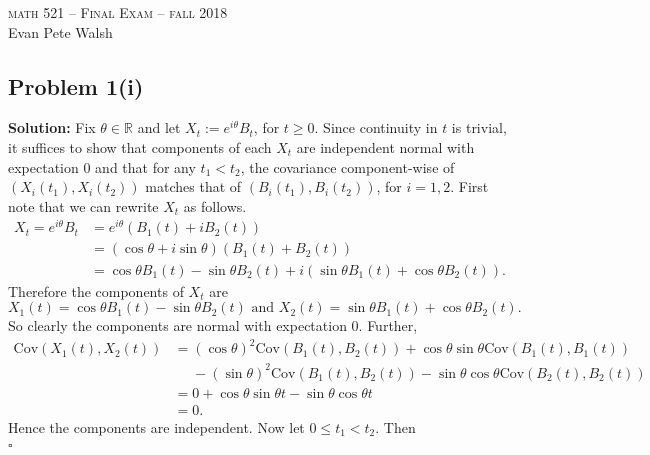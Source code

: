 \documentclass[12pt]{article}
\newcounter{ProofCounter}
\newenvironment{Solution}{\stepcounter{ProofCounter}\textbf{Solution:}}{\hfill$\square$}
\begin{document}
\thispagestyle{empty}
\begin{center}
  \Large \textsc{math 521 -- Final Exam -- fall 2018} \\ 
  \vspace{5mm}
  \large Evan Pete Walsh
\end{center}


\subsection*{Problem 1(i)}
\begin{Solution}
  Fix $\theta \in \mathbb{R}$ and let $X_t := e^{i\theta}B_t$, for $t \geq 0$. Since continuity in $t$ is trivial, it suffices to show that components of each $X_t$ are independent normal with expectation 0 and that for any $t_1 < t_2$, the covariance component-wise of $(X_i(t_1), X_i(t_2))$ matches that of $(B_i(t_1), B_i(t_2))$, for $i = 1,2$. First note that we can rewrite $X_t$ as follows.
  \begin{align*}
    X_t = e^{i\theta}B_t & = e^{i\theta}(B_1(t) + i B_2(t)) \\
    & = (\cos \theta + i \sin \theta) (B_1(t) + B_2(t)) \\
    & = \cos \theta B_1(t) - \sin \theta B_2(t) + i (\sin \theta B_1(t) + \cos \theta B_2(t)).
  \end{align*}
  Therefore the components of $X_t$ are 
  \[
    X_1(t) = \cos \theta B_1(t) - \sin \theta B_2(t) \text{ and } X_2(t) = \sin \theta B_1(t) + \cos \theta B_2(t).
  \]
  So clearly the components are normal with expectation 0. Further,
  \begin{align*}
    \text{Cov}(X_1(t), X_2(t)) & = (\cos \theta)^2 \text{Cov}(B_1(t), B_2(t)) + \cos\theta \sin \theta \text{Cov}(B_1(t), B_1(t)) \\
    & \ \ \ \ \ \ - (\sin\theta)^2\text{Cov}(B_1(t), B_2(t)) - \sin\theta\cos\theta \text{Cov}(B_2(t), B_2(t)) \\
    & = 0 + \cos\theta \sin \theta t - \sin\theta\cos\theta t \\
    & = 0.
  \end{align*}
  Hence the components are independent. Now let $0 \leq t_1 < t_2$. Then
  \begin{align*}

\end{align*}
\end{Solution}
\end{document}
